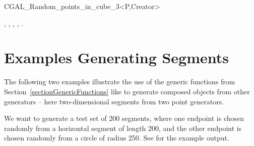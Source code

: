 \ccHtmlNoClassFile
\begin{ccClassTemplate}{CGAL_Random_points_in_cube_3<P,Creator>}
\end{ccClassTemplate}


\ccSeeAlso

, , 
, , 
\ccTexHtml{\\}{}
.


\newpage
\section{Examples Generating Segments}

The following two examples illustrate the use of the generic functions
from Section~\ref{sectionGenericFunctions} like
 to generate composed objects from other
generators -- here two-dimensional segments from two point generators.

We want to generate a test set of 200 segments, where one endpoint is
chosen randomly from a horizontal segment of length 200, and the other
endpoint is chosen randomly from a circle of radius 250. See
 for the example
output.

